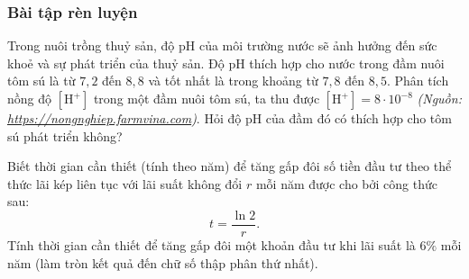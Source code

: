 \subsubsection{Bài tập rèn luyện}
\begin{bt} %
	Trong nuôi trồng thuỷ sản, độ $\mathrm{pH}$ của môi trường nước sẽ ảnh hưởng đến sức khoẻ và sự phát triển của thuỷ sản. Độ $\mathrm{pH}$ thích hợp cho nước trong đầm nuôi tôm sú là từ $7{,}2$ đến $8{,}8$ và tốt nhất là trong khoảng từ $7{,}8$ đến $8{,}5$. Phân tích nồng độ $\left[\mathrm{H}^{+}\right]$ trong một đầm nuôi tôm sú, ta thu được $\left[\mathrm{H}^{+}\right]=8 \cdot 10^{-8}$ \textit{(Nguồn: \href{https://nongnghiep.farmvina.com}{https://nongnghiep.farmvina.com})}. Hỏi độ pH của đầm đó có thích hợp cho tôm sú phát triển không?
\end{bt}
\begin{bt}%
	Biết thời gian cần thiết (tính theo năm) để tăng gấp đôi số tiền đầu tư theo thể thức lãi kép liên tục với lãi suất không đổi $r$ mỗi năm được cho bởi công thức sau:
	$$
	t=\dfrac{\ln 2}{r}.
	$$
	Tính thời gian cần thiết để tăng gấp đôi một khoản đầu tư khi lãi suất là $6 \%$ mỗi năm (làm tròn kết quả đến chữ số thập phân thứ nhất).
\end{bt}
